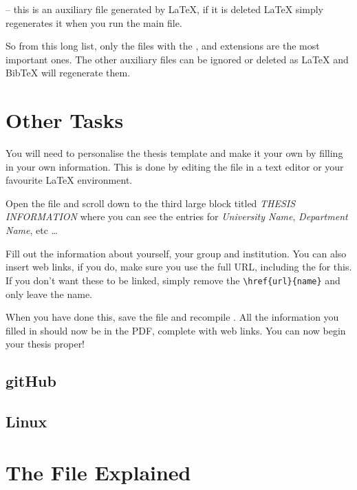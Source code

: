  -- this is an auxiliary file generated by \LaTeX{}, if it is deleted \LaTeX{} simply regenerates it when you run the main  file.

So from this long list, only the files with the ,  and  extensions are the most important ones. The other auxiliary files can be ignored or deleted as \LaTeX{} and BibTeX will regenerate them.


\section{Other Tasks}\label{FillingFile}

You will need to personalise the thesis template and make it your own by filling in your own information. This is done by editing the  file in a text editor or your favourite LaTeX environment.

Open the file and scroll down to the third large block titled \emph{THESIS INFORMATION} where you can see the entries for \emph{University Name}, \emph{Department Name}, etc \ldots

Fill out the information about yourself, your group and institution. You can also insert web links, if you do, make sure you use the full URL, including the  for this. If you don't want these to be linked, simply remove the \verb|\href{url}{name}| and only leave the name.

When you have done this, save the file and recompile . All the information you filled in should now be in the PDF, complete with web links. You can now begin your thesis proper!

\subsection{gitHub}

\subsection{Linux}


\section{The  File Explained}

